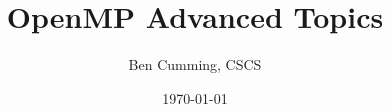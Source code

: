 \documentclass[aspectratio=43]{beamer}
\author{Ben Cumming, CSCS}
\title{OpenMP Advanced Topics}
\subtitle{}
\date{\today}
\begin{document}
\cscstitle



\end{document}
